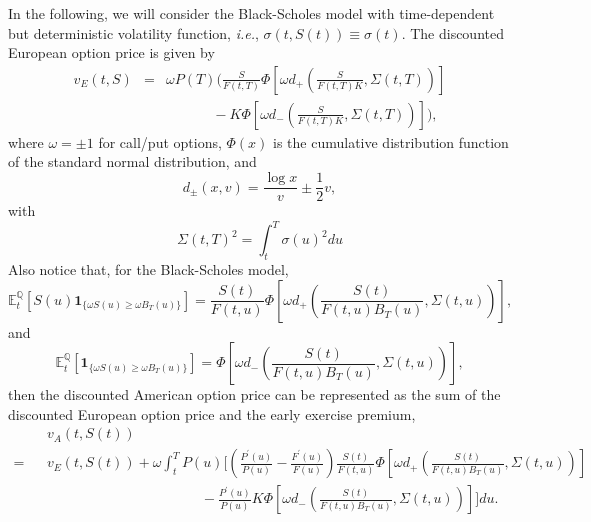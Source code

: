 \documentclass[12pt]{article}
\begin{document}
    In the following, we will consider the Black-Scholes model with time-dependent but deterministic volatility
    function, {\it i.e.}, $\sigma(t,S(t))\equiv \sigma(t)$. The discounted European option price is given by
    \begin{eqnarray}
      \label{Euro1}
      v_E(t,S)&=&\omega P(T)\bigg(\frac{S}{F(t,T)}\Phi\left[\omega d_+\left(\frac{S}{F(t,T)K},\Sigma(t,T)\right)\right]\nonumber\\
                         &&\ \ \ \ \ \ \ \ \ \ \ \ \ \ \ -K\Phi\left[\omega d_-\left(\frac{S}{F(t,T)K},\Sigma(t,T)\right)\right]\bigg),
    \end{eqnarray}
    where $\omega=\pm 1$ for call/put options, $\Phi(x)$ is the cumulative distribution function of the standard
    normal distribution, and
    \begin{equation}
      d_{\pm}(x, v)=\frac{\log x}{v}\pm\frac{1}{2}v,
    \end{equation}
    with
    \begin{equation}
      \Sigma(t,T)^2=\int_t^T\sigma(u)^2du
    \end{equation}
    Also notice that, for the Black-Scholes model,
    \begin{equation}
      {\mathbb E}_t^{\mathbb Q}\left[S(u)\mathbf{1}_{\{\omega S(u)\geq\omega B_T(u)\}}\right]
       = \frac{S(t)}{F(t,u)}\Phi\left[\omega d_+\left(\frac{S(t)}{F(t,u)B_T(u)}, \Sigma(t,u)\right)\right],
    \end{equation}
    and
    \begin{equation}
      {\mathbb E}_t^{\mathbb Q}\left[\mathbf{1}_{\{\omega S(u)\geq\omega B_T(u)\}}\right]
       = \Phi\left[\omega d_-\left(\frac{S(t)}{F(t,u)B_T(u)}, \Sigma(t,u)\right)\right],
    \end{equation}
    then the discounted American option price can be represented as the sum of the discounted European
    option price and the early exercise premium,
    \begin{eqnarray}
      \label{EEP}
      &&v_A(t,S(t))\nonumber\\
      =&&v_E(t,S(t))+\omega\int_t^TP(u)\Bigg[\left(\frac{P^{\prime}(u)}{P(u)}-\frac{F^{\prime}(u)}{F(u)}\right)
      \frac{S(t)}{F(t,u)}\Phi\left[\omega d_+\left(\frac{S(t)}{F(t,u)B_T(u)}, \Sigma(t,u)\right)\right]\nonumber\\
      &&\quad\quad\quad\quad\quad\quad\quad\quad\quad\quad\quad - \frac{P^{\prime}(u)}{P(u)} K
      \Phi\left[\omega d_-\left(\frac{S(t)}{F(t,u)B_T(u)}, \Sigma(t,u)\right)\right] \Bigg]du.
    \end{eqnarray}
\end{document}
